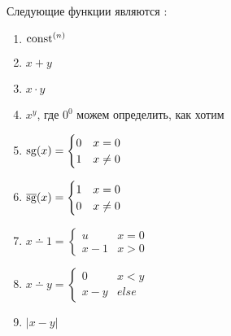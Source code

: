 \begin{lm}\label{lm:rec}
    Следующие функции являются \prf:
	\begin{enumerate}
	\item $ \textmd{const} ^{(n)}$ 
	\item $ x + y$ 
	\item $ x\cdot y$ 
	\item $ x ^{y}$, где $ 0^{0}$ можем определить, как хотим
	\item $ \operatorname{sg}(x) = \begin{cases}
			0 & x= 0 \\
			1 & x\ne 0
		\end{cases}$
	\item $ \operatorname{\overline{sg}}(x) = \begin{cases}
			1 & x= 0 \\
			0 & x\ne 0
		\end{cases}$
	\item $ x \dotminus 1 = \begin{cases}
			u & x = 0 \\
			x - 1 & x > 0
		\end{cases}$ 
	\item $ x \dotminus y = \begin{cases}
			0 & x < y \\
			x - y & else
		\end{cases}$ 
	\item $ \lvert x - y \rvert $
	\end{enumerate}
\end{lm}

